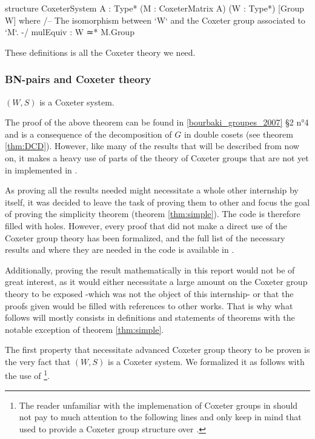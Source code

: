 \begin{leancode}
structure CoxeterSystem {A : Type*} (M : CoxeterMatrix A) (W : Type*) 
    [Group W] where
  /-- The isomorphism between `W` and the Coxeter group associated to `M`. -/
  mulEquiv : W ≃* M.Group
\end{leancode}

These definitions is all the Coxeter theory we need.

\subsubsection{BN-pairs and Coxeter theory}
\label{subsub:Coxeter2}
\begin{theoreme} \label{thm:Coxeter}
    $\left( W,S \right)$ is a Coxeter system.
\end{theoreme}
 The proof of the above theorem can be found in \ref{bourbaki_groupes_2007} §2 n°4 and is a consequence of the decomposition of $G$ in double cosets (see theorem \ref{thm:DCD}). However, like many of the results that will be described from now on, it makes a heavy use of parts of the theory of Coxeter groups that are not yet in implemented in \Lean. 
    
 As proving all the results needed might necessitate a whole other internship by itself, it was decided to leave the task of proving them to other and focus the goal of proving the simplicity theorem (theorem \ref{thm:simple}). The \Lean code is therefore filled with holes. However, every proof that did not make a direct use of the Coxeter group theory has been formalized, and the full list of the necessary results and where they are needed in the code is available in . 

 Additionally, proving the result mathematically in this report would not be of great interest, as it would either necessitate a large amount on the Coxeter group theory to be exposed -which was not the object of this internship- or that the proofs given would be filled with references to other works. That is why what follows will mostly consists in definitions and statements of theorems with the notable exception of theorem \ref{thm:simple}.

The first property that necessitate advanced Coxeter group theory to be proven is the very fact that $\left( W,S \right)$ is a Coxeter system. We formalized it as follows with the use of  \footnote{The reader unfamiliar with the implemenation of Coxeter groups in \Lean should not pay to much attention to the following lines and only keep in mind that used  to provide a Coxeter group structure over .}.  

